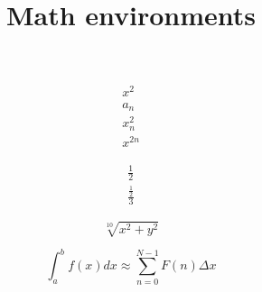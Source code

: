 \documentclass{article}
\title{Math environments}
\begin{document}
\maketitle

\begin{eqnarray}
x^2 \\
%
a_n \\
%
x^2_n \\
%
x^{2n}
\end{eqnarray}

\hrulefill

\begin{eqnarray}
\frac{1}{2} \\
%
\frac{\frac{1}{2}}{3}
\end{eqnarray}

\hrulefill
\begin{equation}
\sqrt[10]{x^2 + y^2}
\end{equation}

\hrulefill
\begin{equation}
\int_a^b f(x) dx \approx \sum_{n=0}^{N-1} F(n) \Delta x
\end{equation}
\end{document}
